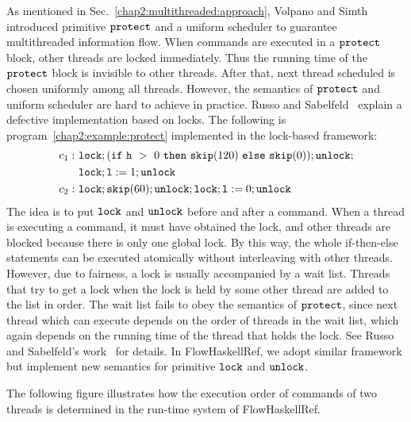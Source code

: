 \documentclass{report}
\newcommand{\co}[1]{$\cod{#1}$}
\begin{document}
As mentioned in Sec.~\ref{chap2:multithreaded:approach}, Volpano and Simth~\cite{Volpano:Smith:Probabilistic}
introduced primitive \co{protect} and a uniform scheduler to guarantee multithreaded information flow. 
When commands are executed in a \co{protect} block, other threads are locked
immediately. Thus the running time of the \co{protect} block is invisible to other threads. After that, next thread
scheduled is chosen uniformly among all threads.
However, the semantics of \co{protect} and uniform scheduler are hard to achieve in practice. 
Russo and Sabelfeld~\cite{Russo:Sabelfeld:CSFW06}
explain a defective implementation based on locks. 
The following is program~\ref{chap2:example:protect} implemented in the lock-based framework:
\begin{align*}
c_1:&~\mathtt{lock};(\mathtt{if}~\mathtt{h}~>~0~\mathtt{then}~\mathtt{skip}(120)~\mathtt{else}~\mathtt{skip}(0));\mathtt{unlock}; \\
    &~\mathtt{lock};\mathtt{l}:=1;\mathtt{unlock} \\
c_2:&~\mathtt{lock};\mathtt{skip}(60);\mathtt{unlock};\mathtt{lock};\mathtt{l}:=0;\mathtt{unlock}
\end{align*}
The idea is to put \co{lock} and \co{unlock} before and after a command. When a thread is executing a command,
it must have obtained the lock, and other threads are blocked because there is only one global lock. By this way, the
whole if-then-else statements can be executed atomically without interleaving with other threads.
However, due to fairness, a lock is usually accompanied by a wait
list. Threads that try to get a lock when the lock is held by some other thread are added to the list in order. 
The wait list fails to obey the semantics of \co{protect}, since next thread which can execute depends on the order
of threads in the wait list, which again depends on the running time of the thread that holds the lock. 
See Russo and Sabelfeld's work~\cite{Russo:Sabelfeld:CSFW06} for details.
In FlowHaskellRef, we adopt similar framework but implement new semantics for primitive \co{lock} and \co{unlock}.

The following figure illustrates how the execution order of commands of two threads is determined in the 
run-time system of FlowHaskellRef.

\end{document}
